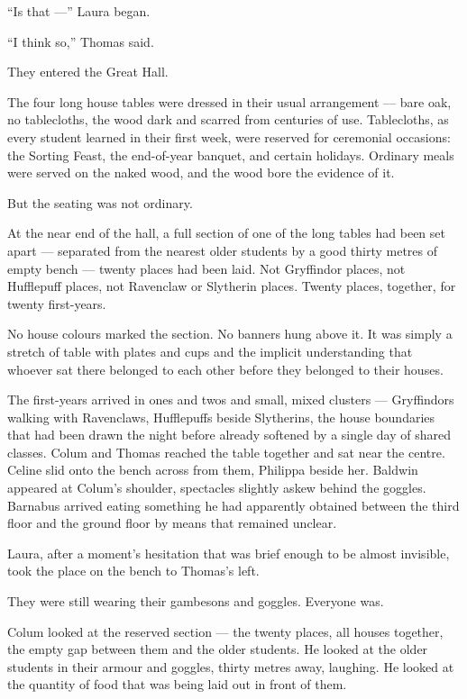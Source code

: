 \enquote{Is that ---} Laura began.
 
\enquote{I think so,} Thomas said.
 
They entered the Great Hall.
 
The four long house tables were dressed in their usual arrangement --- bare oak, no tablecloths, the wood dark and scarred from centuries of use. Tablecloths, as every student learned in their first week, were reserved for ceremonial occasions: the Sorting Feast, the end-of-year banquet, and certain holidays. Ordinary meals were served on the naked wood, and the wood bore the evidence of it.
 
But the seating was not ordinary.
 
At the near end of the hall, a full section of one of the long tables had been set apart --- separated from the nearest older students by a good thirty metres of empty bench --- twenty places had been laid. Not Gryffindor places, not Hufflepuff places, not Ravenclaw or Slytherin places. Twenty places, together, for twenty first-years.
 
No house colours marked the section. No banners hung above it. It was simply a stretch of table with plates and cups and the implicit understanding that whoever sat there belonged to each other before they belonged to their houses.
 
The first-years arrived in ones and twos and small, mixed clusters --- Gryffindors walking with Ravenclaws, Hufflepuffs beside Slytherins, the house boundaries that had been drawn the night before already softened by a single day of shared classes. Colum and Thomas reached the table together and sat near the centre. Celine slid onto the bench across from them, Philippa beside her. Baldwin appeared at Colum's shoulder, spectacles slightly askew behind the goggles. Barnabus arrived eating something he had apparently obtained between the third floor and the ground floor by means that remained unclear.
 
Laura, after a moment's hesitation that was brief enough to be almost invisible, took the place on the bench to Thomas's left.
 
They were still wearing their gambesons and goggles. Everyone was.
 
Colum looked at the reserved section --- the twenty places, all houses together, the empty gap between them and the older students. He looked at the older students in their armour and goggles, thirty metres away, laughing. He looked at the quantity of food that was being laid out in front of them.
 
